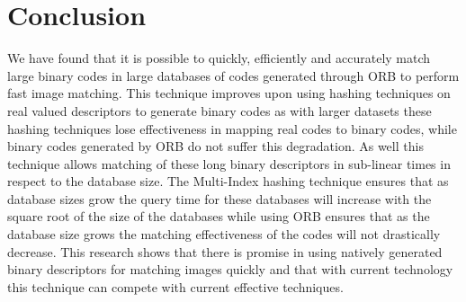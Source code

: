 \chapter{Conclusion}
We have found that it is possible to quickly, efficiently and accurately match large binary codes in large databases of codes generated through ORB to perform fast image matching. This technique improves upon using hashing techniques on real valued descriptors to generate binary codes as with larger datasets these hashing techniques lose effectiveness in mapping real codes to binary codes, while binary codes generated by ORB do not suffer this degradation. As well this technique allows matching of these long binary descriptors in sub-linear times in respect to the database size. The Multi-Index hashing technique ensures that as database sizes grow the query time for these databases will increase with the square root of the size of the databases while using ORB ensures that as the database size grows the matching effectiveness of the codes will not drastically decrease. This research shows that there is promise in using natively generated binary descriptors for matching images quickly and that with current technology this technique can compete with current effective techniques.